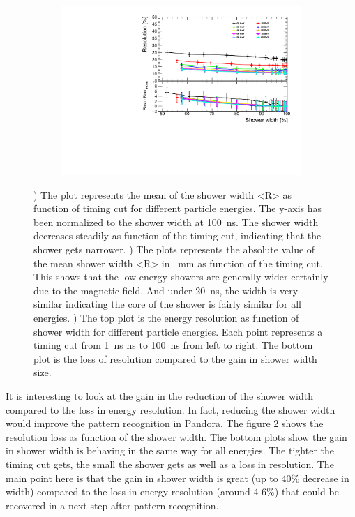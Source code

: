 \begin{figure}[htbp!]
\begin{subfigure}[t]{0.48\textwidth}
    \includegraphics[width=1\linewidth]{../Thesis_Plots/ILD/NoSmearing/Plots/ShowerWidth_Resolution_noSmearing}
    \caption{}  \label{fig:ShowerWidthResoNoSmearing}
  \end{subfigure}
  \caption{) The plot represents the mean of the shower width <R> as function of timing cut for different particle energies. The y-axis has been normalized to the shower width at \SI{100}{\nano\second}. The shower width decreases steadily as function of the timing cut, indicating that the shower gets narrower. ) The plots represents the absolute value of the mean shower width <R> in \SI{}{\milli\meter} as function of the timing cut. This shows that the low energy showers are generally wider certainly due to the magnetic field. And under \SI{20}{\nano\second}, the width is very similar indicating the core of the shower is fairly similar for all energies. ) The top plot is the energy resolution as function of shower width for different particle energies. Each point represents a timing cut from \SI{1}{\nano\second} ns to \SI{100}{\nano\second} from left to right. The bottom plot is the loss of resolution compared to the gain in shower width size.}
\end{figure}

It is interesting to look at the gain in the reduction of the shower width compared to the loss in energy resolution. In fact, reducing the shower width would improve the pattern recognition in Pandora. The figure \ref{fig:ShowerWidthResoNoSmearing} shows the resolution loss as function of the shower width. The bottom plots show the gain in shower width is behaving in the same way for all energies. The tighter the timing cut gets, the small the shower gets as well as a loss in resolution. The main point here is that the gain in shower width is great (up to 40\% decrease in width) compared to the loss in energy resolution (around 4-6\%) that could be recovered in a next step after pattern recognition.

